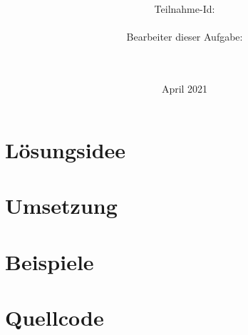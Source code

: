 \documentclass[a4paper,10pt,ngerman]{scrartcl}
\title{\textbf{\Huge\Aufgabe}}
\author{\LARGE Teilnahme-Id: \LARGE \TeilnahmeId \\\\
	    \LARGE Bearbeiter dieser Aufgabe: \\ 
	    \LARGE \Namen\\\\}
\date{\LARGE April 2021}
\theoremstyle{definition}
\theoremstyle{theorem}
\begin{document}
\maketitle
\tableofcontents
\newpage

\section{Lösungsidee}












\printbibliography

\newpage
\section{Umsetzung}\label{sec:umsetzung}




\newpage
\section{Beispiele}


\newpage
\section{Quellcode}

\end{document}
